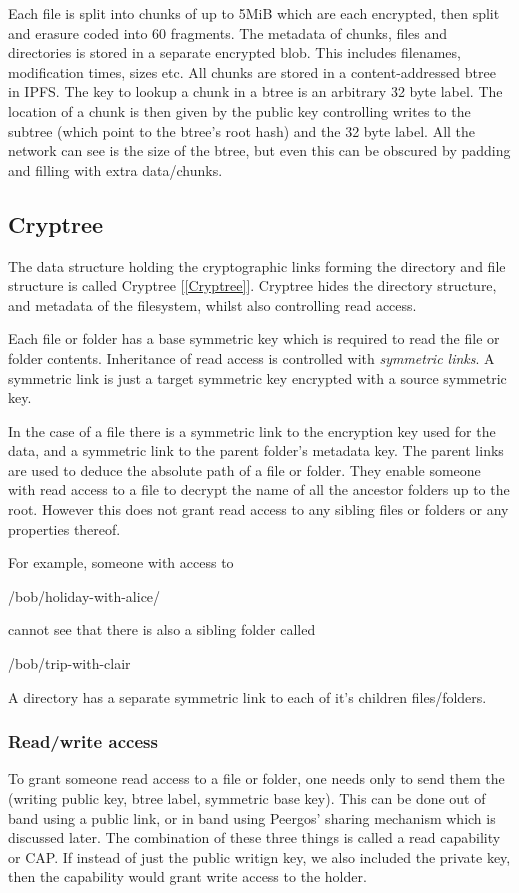 \documentclass[12pt]{article}
\begin{document}
Each file is split into chunks of up to 5MiB which are each encrypted, then split and erasure coded into 60 fragments. The metadata of chunks, files and directories is stored in a separate encrypted blob. This includes filenames, modification times, sizes etc. All chunks are stored in a content-addressed btree in IPFS. The key to lookup a chunk in a btree is an arbitrary 32 byte label. The location of a chunk is then given by the public key controlling writes to the subtree (which point to the btree's root hash) and the 32 byte label. All the network can see is the size of the btree, but even this can be obscured by padding and filling with extra data/chunks. 

\subsection*{Cryptree}
The data structure holding the cryptographic links forming the directory and file structure is called Cryptree [\ref{Cryptree}]. Cryptree hides the directory structure, and metadata of the filesystem, whilst also controlling read access. 


Each file or folder has a base symmetric key which is required to read the file or folder contents. Inheritance of read access is controlled with \emph{symmetric links}. A symmetric link is just a target symmetric key encrypted with a source symmetric key.

In the case of a file there is a symmetric link to the encryption key used for the data, and a symmetric link to the parent folder's metadata key. The parent links are used to deduce the absolute path of a file or folder. They enable someone with read access to a file to decrypt the name of all the ancestor folders up to the root. However this does not grant read access to any sibling files or folders or any properties thereof.

For example, someone with access to

/bob/holiday-with-alice/

cannot see that there is also a sibling folder called

/bob/trip-with-clair

A directory has a separate symmetric link to each of it's children files/folders. 


\subsubsection*{Read/write access}
To grant someone read access to a file or folder, one needs only to send them the (writing public key, btree label, symmetric base key). This can be done out of band using a public link, or in band using Peergos' sharing mechanism which is discussed later. The combination of these three things is called a read capability or CAP. If instead of just the public writign key, we also included the private key, then the capability would grant write access to the holder. 
\end{document}
